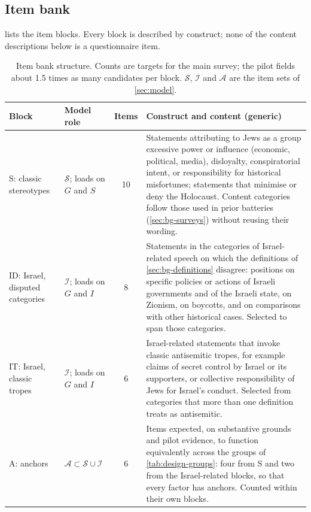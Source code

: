 \subsection{Item bank}\label{sec:design-items}

 lists the item blocks. Every block is described by construct; none of the content descriptions below is a questionnaire item.

\begin{table}[tb]
\centering
\caption{Item bank structure. Counts are targets for the main survey; the pilot fields about 1.5 times as many candidates per block. $\mathcal{S}$, $\mathcal{I}$ and $\mathcal{A}$ are the item sets of \cref{sec:model}.}\label{tab:design-items}
\footnotesize
\setlength{\tabcolsep}{4pt}
\renewcommand{\arraystretch}{1.15}
\begin{tabularx}{\textwidth}{@{}>{\raggedright\arraybackslash}p{2.6cm}>{\raggedright\arraybackslash}p{1.9cm}c>{\raggedright\arraybackslash}X@{}}
\toprule
Block & Model role & Items & Construct and content (generic) \\
\midrule
S: classic stereotypes & $\mathcal{S}$; loads on $G$ and $S$ & 10 & Statements attributing to Jews as a group excessive power or influence (economic, political, media), disloyalty, conspiratorial intent, or responsibility for historical misfortunes; statements that minimise or deny the Holocaust. Content categories follow those used in prior batteries (\cref{sec:bg-surveys}) without reusing their wording. \\
\addlinespace
ID: Israel, disputed categories & $\mathcal{I}$; loads on $G$ and $I$ & 8 & Statements in the categories of Israel-related speech on which the definitions of \cref{sec:bg-definitions} disagree: positions on specific policies or actions of Israeli governments and of the Israeli state, on Zionism, on boycotts, and on comparisons with other historical cases. Selected to span those categories. \\
\addlinespace
IT: Israel, classic tropes & $\mathcal{I}$; loads on $G$ and $I$ & 6 & Israel-related statements that invoke classic antisemitic tropes, for example claims of secret control by Israel or its supporters, or collective responsibility of Jews for Israel's conduct. Selected from categories that more than one definition treats as antisemitic. \\
\addlinespace
A: anchors & $\mathcal{A}\subset\mathcal{S}\cup\mathcal{I}$ & 6 & Items expected, on substantive grounds and pilot evidence, to function equivalently across the groups of \cref{tab:design-groups}: four from S and two from the Israel-related blocks, so that every factor has anchors. Counted within their own blocks. \\

\end{tabularx}
\end{table}
